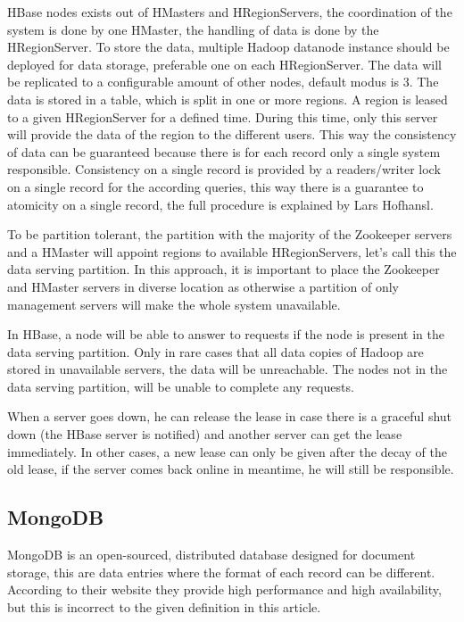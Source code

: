 \documentclass[10pt,conference,letterpaper]{IEEEtran}
\begin{document}
HBase nodes exists out of HMasters and HRegionServers, the coordination of the system is done by one HMaster, the handling of data is done by the HRegionServer. To store the data, multiple Hadoop datanode instance should be deployed for data storage, preferable one on each HRegionServer. The data will be replicated to a configurable amount of other nodes, default modus is 3. The data is stored in a table, which is split in one or more regions. A region is leased to a given HRegionServer for a defined time. During this time, only this server will provide the data of the region to the different users. This way the consistency of data can be guaranteed because there is for each record only a single system responsible. Consistency on a single record is provided by a readers/writer lock on a single record for the according queries, this way there is a guarantee to atomicity on a single record, the full procedure is explained by Lars Hofhansl\cite{hbase-acid}. 

To be partition tolerant, the partition with the majority of the Zookeeper servers and a HMaster will appoint regions to available HRegionServers, let's call this the data serving partition. In this approach, it is important to place the Zookeeper and HMaster servers in diverse location as otherwise a partition of only management servers will make the whole system unavailable. 

In HBase, a node will be able to answer to requests if the node is present in the data serving partition. Only in rare cases that all data copies of Hadoop are stored in unavailable servers, the data will be unreachable. The nodes not in the data serving partition, will be unable to complete any requests. 

When a server goes down, he can release the lease in case there is a graceful shut down (the HBase server is notified) and another server can get the lease immediately. In other cases, a new lease can only be given after the decay of the old lease, if the server comes back online in meantime, he will still be responsible. 

\subsection{MongoDB}
MongoDB\cite{mongodb-doc} is an open-sourced, distributed database designed for document storage, this are data entries where the format of each record can be different. According to their website they provide high performance and high availability, but this is incorrect to the given definition in this article. 
\end{document}
